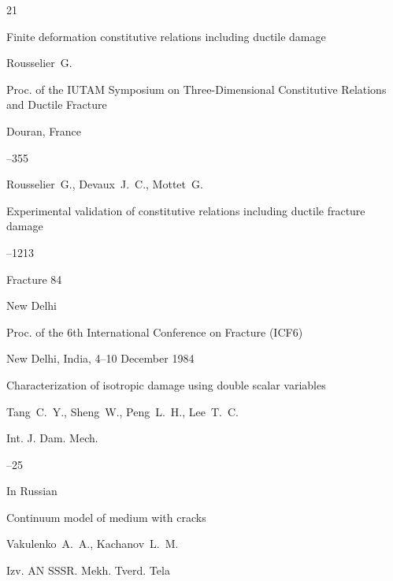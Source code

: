\begin{thebibliography}{21}

\paper Finite deformation constitutive relations including ductile damage

\by Rousselier~G.

\inbook Proc. of the IUTAM Symposium on Three-Dimensional Constitutive Relations and Ductile Fracture

\publaddr Douran, France


--355




\by Rousselier~G., Devaux~J.~C., Mottet~G. 

\paper Experimental validation of constitutive relations including ductile fracture damage


--1213

\inbook Fracture 84 


\publaddr New Delhi

\volinfo Proc. of the 6th International Conference on Fracture (ICF6)

\procinfo New Delhi, India, 4–10 December 1984





\paper Characterization of isotropic damage using double scalar variables

\by Tang~C.~Y., Sheng~W., Peng~L.~H., Lee~T.~C.

\jour Int. J. Dam. Mech.





--25




\lang In Russian

\paper  Continuum model of medium with cracks

\by Vakulenko~A.~A., Kachanov~L.~M.

\jour Izv. AN SSSR. Mekh. Tverd. Tela



\end{thebibliography}
